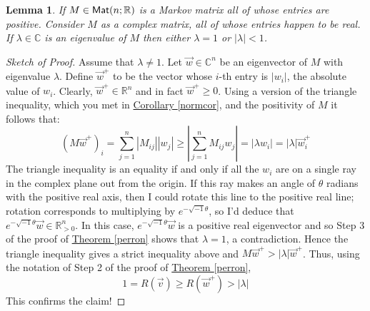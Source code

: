 \documentclass[11pt]{amsbook}
\newtheorem{lemma}[theorem]{Lemma}
\theoremstyle{definition}
\begin{document}
\begin{lemma} \label{smalleval} If $M\in {\sf Mat}(n;\mathbb{R})$ is a Markov matrix all of whose entries are positive. Consider $M$ as a complex matrix, all of whose entries happen to be real. If $\lambda\in \mathbb{C}$ is an eigenvalue of $M$ then either $\lambda = 1$ or $|\lambda| <1$.
\end{lemma}
\begin{proof}[Sketch of Proof]
Assume that $\lambda \neq 1$. Let $\vec{w}\in \mathbb{C}^n$ be an eigenvector of $M$ with eigenvalue $\lambda$. Define $\vec{w}^+$ to be the vector whose $i$-th entry is $|w_i|$, the absolute value of $w_i$. Clearly, $\vec{w}^+ \in \mathbb{R}^n$ and in fact $\vec{w}^+ \geqslant 0$. Using a version of the triangle inequality, which you met in \hyperref[normcor]{Corollary \ref{normcor}}, and the positivity of $M$ it follows that:
$$ (M \vec{w}^+)_i  = \sum_{j=1}^n |M_{ij}||{w}_j| \geqslant | \sum_{j=1}^n M_{ij}w_j| = |\lambda w_i| = |\lambda|\vec{w}_i^+$$
The triangle inequality is an equality if and only if all the $w_i$ are on a single ray in the complex plane out from the origin. If this ray makes an angle of $\theta$ radians with the positive real axis, then I could rotate this line to the positive real line; rotation corresponds to multiplying by $e^{-\sqrt{-1}\theta}$, so I'd deduce that $e^{-\sqrt{-1}\theta} \vec{w} \in \mathbb{R}_{>0}^n$. In this case, $e^{-\sqrt{-1}\theta} \vec{w}$ is a positive real eigenvector and so Step 3 of the proof of \hyperref[perron]{Theorem \ref{perron}} shows that $\lambda =1$, a contradiction. Hence the triangle inequality gives a strict inequality above and  $M \vec{w}^+ > |\lambda| \vec{w}^+$. Thus, using the notation of Step 2 of the proof of \hyperref[perron]{Theorem \ref{perron}}, $$1 = R(\vec{v}) \geqslant R(\vec{w}^+) > |\lambda|$$ This confirms the claim!
\end{proof}
\end{document}
